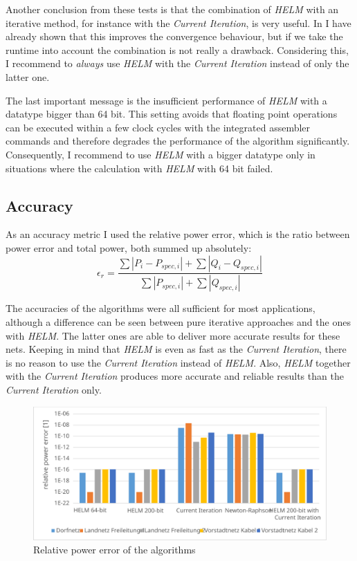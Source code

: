 Another conclusion from these tests is that the combination of \emph{HELM} with an iterative method, for instance with the \emph{Current Iteration}, is very useful. In  I have already shown that this improves the convergence behaviour, but if we take the runtime into account the combination is not really a drawback. Considering this, I recommend to \emph{always} use \emph{HELM} with the \emph{Current Iteration} instead of only the latter one.

The last important message is the insufficient performance of \emph{HELM} with a datatype bigger than 64 bit. This setting avoids that floating point operations can be executed within a few clock cycles with the integrated assembler commands and therefore degrades the performance of the algorithm significantly. Consequently, I recommend to use \emph{HELM} with a bigger datatype only in situations where the calculation with \emph{HELM} with 64 bit failed.

\subsection{Accuracy}

As an accuracy metric I used the relative power error, which is the ratio between power error and total power, both summed up absolutely:
\begin{equation}
	\epsilon_r = \frac{\sum |P_i - P_{spec,i}| + \sum |Q_i - Q_{spec,i}|}{\sum |P_{spec,i}| + \sum |Q_{spec,i}|}
\end{equation}

The accuracies of the algorithms  were all sufficient for most applications, although a difference can be seen between pure iterative approaches and the ones with \emph{HELM}. The latter ones are able to deliver more accurate results for these nets. Keeping in mind that \emph{HELM} is even as fast as the \emph{Current Iteration}, there is no reason to use the \emph{Current Iteration} instead of \emph{HELM}. Also, \emph{HELM} together with the \emph{Current Iteration} produces more accurate and reliable results than the \emph{Current Iteration} only.

\begin{figure}
	\centering
	\includegraphics[scale=0.7]{figures/comparison_accuracy}
	\caption[Comparison, accuracy]{Relative power error of the algorithms}
	\label{fig:comparison_accuracy}
\end{figure}

